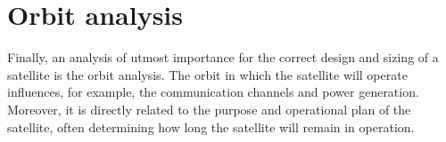 
\section{Orbit analysis}





Finally, an analysis of utmost importance for the correct design and sizing of a satellite is the orbit analysis. The orbit in which the satellite will operate influences, for example, the communication channels and power generation. Moreover, it is directly related to the purpose and operational plan of the satellite, often determining how long the satellite will remain in operation.

